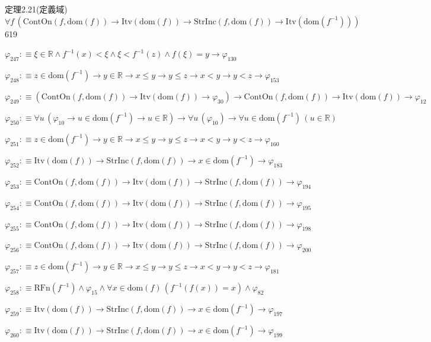 \begin{fullproof}{定理2.21(定義域)}{$\forall f\,(\mathrm{ContOn}(f,\mathrm{dom}(f)) \to \mathrm{Itv}(\mathrm{dom}(f)) \to \mathrm{StrInc}(f,\mathrm{dom}(f)) \to \mathrm{Itv}(\mathrm{dom}(f^{-1})))$}{619}
\begin{abbrevlist}
\item $\varphi_{247} :\equiv \xi \in \mathbb{R} \land f^{-1}(x) < \xi \land \xi < f^{-1}(z) \land f(\xi) = y \to \varphi_{130}$
\item $\varphi_{248} :\equiv z \in \mathrm{dom}(f^{-1}) \to y \in \mathbb{R} \to x \leq y \to y \leq z \to x < y \to y < z \to \varphi_{153}$
\item $\varphi_{249} :\equiv (\mathrm{ContOn}(f,\mathrm{dom}(f)) \to \mathrm{Itv}(\mathrm{dom}(f)) \to \varphi_{30}) \to \mathrm{ContOn}(f,\mathrm{dom}(f)) \to \mathrm{Itv}(\mathrm{dom}(f)) \to \varphi_{12}$
\item $\varphi_{250} :\equiv \forall u\,(\varphi_{10} \to u \in \mathrm{dom}(f^{-1}) \to u \in \mathbb{R}) \to \forall u\,(\varphi_{10}) \to \forall u \in \mathrm{dom}(f^{-1})\,(u \in \mathbb{R})$
\item $\varphi_{251} :\equiv z \in \mathrm{dom}(f^{-1}) \to y \in \mathbb{R} \to x \leq y \to y \leq z \to x < y \to y < z \to \varphi_{160}$
\item $\varphi_{252} :\equiv \mathrm{Itv}(\mathrm{dom}(f)) \to \mathrm{StrInc}(f,\mathrm{dom}(f)) \to x \in \mathrm{dom}(f^{-1}) \to \varphi_{183}$
\item $\varphi_{253} :\equiv \mathrm{ContOn}(f,\mathrm{dom}(f)) \to \mathrm{Itv}(\mathrm{dom}(f)) \to \mathrm{StrInc}(f,\mathrm{dom}(f)) \to \varphi_{194}$
\item $\varphi_{254} :\equiv \mathrm{ContOn}(f,\mathrm{dom}(f)) \to \mathrm{Itv}(\mathrm{dom}(f)) \to \mathrm{StrInc}(f,\mathrm{dom}(f)) \to \varphi_{195}$
\item $\varphi_{255} :\equiv \mathrm{ContOn}(f,\mathrm{dom}(f)) \to \mathrm{Itv}(\mathrm{dom}(f)) \to \mathrm{StrInc}(f,\mathrm{dom}(f)) \to \varphi_{198}$
\item $\varphi_{256} :\equiv \mathrm{ContOn}(f,\mathrm{dom}(f)) \to \mathrm{Itv}(\mathrm{dom}(f)) \to \mathrm{StrInc}(f,\mathrm{dom}(f)) \to \varphi_{200}$
\item $\varphi_{257} :\equiv z \in \mathrm{dom}(f^{-1}) \to y \in \mathbb{R} \to x \leq y \to y \leq z \to x < y \to y < z \to \varphi_{181}$
\item $\varphi_{258} :\equiv \mathrm{RFn}(f^{-1}) \land \varphi_{15} \land \forall x \in \mathrm{dom}(f)\,(f^{-1}(f(x)) = x) \land \varphi_{82}$
\item $\varphi_{259} :\equiv \mathrm{Itv}(\mathrm{dom}(f)) \to \mathrm{StrInc}(f,\mathrm{dom}(f)) \to x \in \mathrm{dom}(f^{-1}) \to \varphi_{197}$
\item $\varphi_{260} :\equiv \mathrm{Itv}(\mathrm{dom}(f)) \to \mathrm{StrInc}(f,\mathrm{dom}(f)) \to x \in \mathrm{dom}(f^{-1}) \to \varphi_{199}$

\end{abbrevlist}
\end{fullproof}
